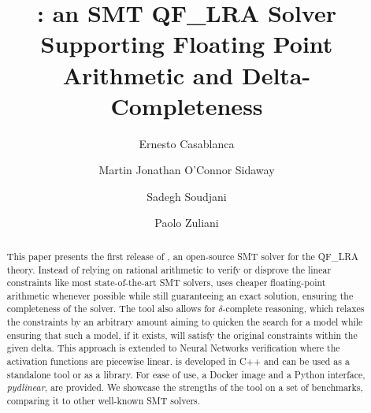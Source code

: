 \documentclass[runningheads]{llncs}
\begin{document}
\title{\dlinear: an SMT QF\_LRA Solver Supporting Floating Point Arithmetic and Delta-Completeness}
\titlerunning{\dlinear}

\author{Ernesto Casablanca
    \and
    Martin Jonathan O'Connor Sidaway
    \and
    Sadegh Soudjani
    \and
    Paolo Zuliani
}



\maketitle

\begin{abstract}
    This paper presents the first release of \dlinear, an open-source SMT solver for the QF\_LRA theory.
    Instead of relying on rational arithmetic to verify or disprove the linear constraints like most state-of-the-art SMT solvers, \dlinear uses cheaper floating-point arithmetic whenever possible while still guaranteeing an exact solution, ensuring the completeness of the solver.
    The tool also allows for $\delta$-complete reasoning, which relaxes the constraints by an arbitrary amount aiming to quicken the search for a model while ensuring that such a model, if it exists, will satisfy the original constraints within the given delta.
    This approach is extended to Neural Networks verification where the activation functions are piecewise linear.
    \dlinear is developed in C++ and can be used as a standalone tool or as a library.
    For ease of use, a Docker image and a Python interface, \textit{pydlinear}, are provided.
    We showcase the strengths of the tool on a set of benchmarks, comparing it to other well-known SMT solvers.

\end{abstract}
\end{document}
